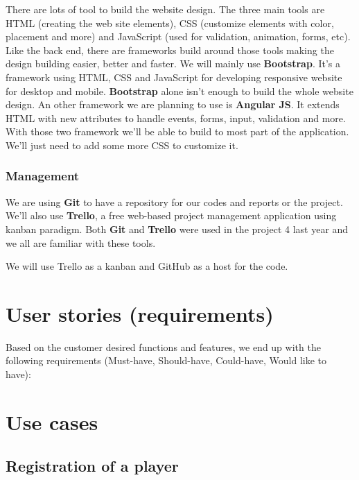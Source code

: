 There are lots of tool to build the website design. The three main tools are HTML (creating the web site elements), CSS (customize elements with color, placement and more) and JavaScript (used for validation, animation, forms, etc). Like the back end, there are frameworks build around those tools making the design building easier, better and faster. We will mainly use \textbf{Bootstrap}. It's a framework using HTML, CSS and JavaScript for developing responsive website for desktop and mobile. \textbf{Bootstrap} alone isn't enough to build the whole website design. An other framework we are planning to use is \textbf{Angular JS}. It extends HTML with new attributes to handle events, forms, input, validation and more. With those two framework we'll be able to build to most part of the application. We'll just need to add some more CSS to customize it.

\subsubsection{Management}

We are using \textbf{Git} to have a repository for our codes and reports or the project. We'll also use \textbf{Trello}, a free web-based project management application using kanban paradigm. Both \textbf{Git} and \textbf{Trello} were used in the project 4 last year and we all are familiar with these tools.

We will use Trello as a kanban and GitHub as a host for the code. \newline
\fi

\section{User stories (requirements)}
Based on the customer desired functions and features, we end up with the
following requirements (Must-have, Should-have, Could-have, Would like
to have):



\section{Use cases}
\subsection{Registration of a player}

